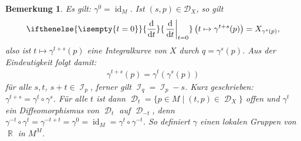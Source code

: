 \documentclass[paper=A4, twoside, chapterprefix=true, bibliography=totoc, headsepline]{scrbook}
\DeclareMathOperator{\R}{\mathbb{R}}
\DeclareMathOperator{\calD}{\mathcal{D}}
\DeclareMathOperator{\calI}{\mathcal{I}}
\DeclareMathOperator{\id}{id}       %
\DeclareMathOperator{\Id}{id}       %
\newcommand{\dop}{\mathrm{d}}
\newcommand{\difffrac}[3][]{\ifthenelse{\isempty{#1}}{\frac{\dop #2}{\dop #3}}{\left. \frac{\dop #2}{\dop #3} \right|_{#1}}}
\theoremstyle{plain}
\theoremstyle{nonumberplain}
\newtheorem{bem}{Bemerkung}
\theoremstyle{empty}
\theoremstyle{break}
\newcommand{\quot}[1]{\textrm{\glqq}{#1}\textrm{\grqq}}
\begin{document}
\begin{bem}
Es gilt: $\gamma^0 = \Id_M$. Ist $(s,p) \in \mathcal D_{X}$, so gilt
\begin{align*}
	\difffrac[t=0]{}{t} \left(t \mapsto \gamma^{t+s}(p) \right) = X_{\gamma^s(p)},
\end{align*}
also ist $t \mapsto \gamma^{t+s}(p)$ eine Integralkurve von $X$ durch $q = \gamma^s(p)$. Aus der Eindeutigkeit folgt damit:
\begin{align*}
	\gamma^{t+s}(p) = \gamma^t(\gamma^s(p))
\end{align*}
f\"ur alle $s, t$, $s+t \in \calI_p$, ferner gilt $\calI_q = \calI_p - s$.
Kurz geschrieben: $\gamma^{t+s} = \gamma^t \circ \gamma^s$.
F\"ur alle $t$ ist dann $\calD_t = \{ p \in M \mid (t,p) \in \calD_X \}$ offen und $\gamma^t$ ein Diffeomorphismus von $\calD_t$ auf $\calD_{-t}$, denn $\gamma^{-t} \circ \gamma^{t} = \gamma^{-t+t} = \gamma^{0} = \id_M = \gamma^{t} \circ \gamma^{-t}$.
So definiert $\gamma$ einen \quot{lokalen Gruppen} von $\R$ in $M^M$.
\end{bem}


\end{document}
